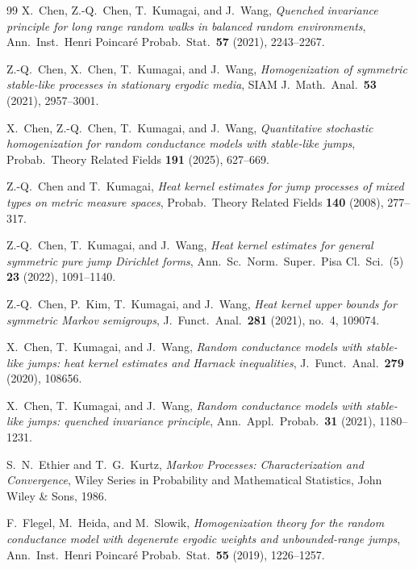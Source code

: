 \documentclass[11pt]{amsart}
\theoremstyle{plain}
\theoremstyle{definition}
\theoremstyle{remark}
\begin{document}
\begin{thebibliography}{99}
		X.~Chen, Z.-Q.~Chen, T.~Kumagai, and J.~Wang,
		\emph{Quenched invariance principle for long range random walks in balanced random environments},
		Ann.\ Inst.\ Henri Poincar\'e Probab.\ Stat.\ \textbf{57} (2021), 2243--2267.
		
		Z.-Q.~Chen, X.~Chen, T.~Kumagai, and J.~Wang,
		\emph{Homogenization of symmetric stable-like processes in stationary ergodic media},
		SIAM J.\ Math.\ Anal.\ \textbf{53} (2021), 2957--3001.
		
		X.~Chen, Z.-Q.~Chen, T.~Kumagai, and J.~Wang,
		\emph{Quantitative stochastic homogenization for random conductance models with stable-like jumps},
		Probab.\ Theory Related Fields \textbf{191} (2025), 627--669.
		
		Z.-Q.~Chen and T.~Kumagai,
		\emph{Heat kernel estimates for jump processes of mixed types on metric measure spaces},
		Probab.\ Theory Related Fields \textbf{140} (2008), 277--317.
		
		Z.-Q.~Chen, T.~Kumagai, and J.~Wang,
		\emph{Heat kernel estimates for general symmetric pure jump Dirichlet forms},
		Ann.\ Sc.\ Norm.\ Super.\ Pisa Cl.\ Sci.\ (5) \textbf{23} (2022), 1091--1140.
		
		Z.-Q.~Chen, P.~Kim, T.~Kumagai, and J.~Wang,
		\emph{Heat kernel upper bounds for symmetric Markov semigroups},
		J.\ Funct.\ Anal.\ \textbf{281} (2021), no.~4, 109074.
		
		X.~Chen, T.~Kumagai, and J.~Wang,
		\emph{Random conductance models with stable-like jumps: heat kernel estimates and Harnack inequalities},
		J.\ Funct.\ Anal.\ \textbf{279} (2020), 108656.
		
		X.~Chen, T.~Kumagai, and J.~Wang,
		\emph{Random conductance models with stable-like jumps: quenched invariance principle},
		Ann.\ Appl.\ Probab.\ \textbf{31} (2021), 1180--1231.
		
		S.~N.~Ethier and T.~G.~Kurtz,
		\emph{Markov Processes: Characterization and Convergence},
		Wiley Series in Probability and Mathematical Statistics, John Wiley \& Sons, 1986.
		
		F.~Flegel, M.~Heida, and M.~Slowik,
		\emph{Homogenization theory for the random conductance model with degenerate ergodic weights and unbounded-range jumps},
		Ann.\ Inst.\ Henri Poincar\'e Probab.\ Stat.\ \textbf{55} (2019), 1226--1257.
		

\end{thebibliography}
\end{document}
